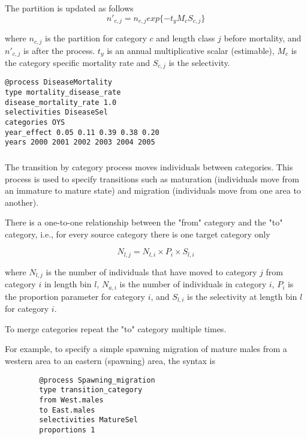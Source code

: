 The partition is updated as follows
\begin{equation}
	n'_{c,j} = n_{c,j}  exp\{-t_y M_{c} S_{c,j} \}
\end{equation}

where \(n_{c,j}\) is the partition for category \(c\) and length class \(j\) before mortality, and \(n'_{c,j}\)  is after the process. \(t_y\) is an annual multiplicative scalar (estimable), \(M_{c}\) is the category specific mortality rate and \(S_{c,j}\) is the selectivity.
 
{\small{\begin{verbatim}
@process DiseaseMortality
type mortality_disease_rate
disease_mortality_rate 1.0
selectivities DiseaseSel 
categories OYS
year_effect 0.05 0.11 0.39 0.38 0.20 
years 2000 2001 2002 2003 2004 2005 
		\end{verbatim}}}

\subsubsection{}\label{sec:Process-TransitionCategory}

The transition by category process moves individuals between categories. This process is used to specify transitions such as maturation (individuals move from an immature to mature state) and migration (individuals move from one area to another).

There is a one-to-one relationship between the "from" category and the "to" category, i.e., for every source category there is one target category only

\begin{equation}
N_{l,j} = N_{l,i} \times P_i \times S_{l,i}
\end{equation}

where $N_{l,j}$ is the number of individuals that have moved to category $j$ from category $i$ in length bin $l$, $N_{a,i}$ is the number of individuals in category $i$, $P_i$ is the proportion parameter for category $i$, and $S_{l,i}$ is the selectivity at length bin $l$ for category $i$.

To merge categories repeat the "to" category multiple times.

For example, to specify a simple spawning migration of mature males from a western area to an eastern (spawning) area, the syntax is

{\small{\begin{verbatim}
		@process Spawning_migration
		type transition_category
		from West.males
		to East.males
		selectivities MatureSel
		proportions 1
		\end{verbatim}}}

